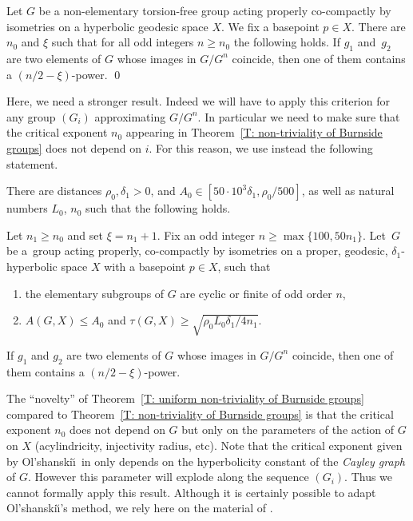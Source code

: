 \begin{thm}
\label{T: non-triviality of Burnside groups}
Let $G$ be a non-elementary torsion-free group acting properly co-compactly by isometries on a hyperbolic geodesic space $X$.
We fix a basepoint $p \in X$.
There are $n_0$ and $\xi$ such that for all odd integers $n\geqslant n_0$ the following holds.
If $g_1$ and~$g_2$ are two elements of $G$ whose images in $G/G^n$ coincide, then one of them contains a $(n/2-\xi)$-power. \qed
\end{thm}

Here, we need a stronger result.
Indeed we will have to apply this criterion for any group $(G_i)$ approximating $G/G^n$.
In particular we need to make sure that the critical exponent $n_0$ appearing in Theorem~\ref{T: non-triviality of Burnside groups} does not depend on $i$.
For this reason, we use instead the following statement.

\begin{thm}
\label{T: uniform non-triviality of Burnside groups}
There are distances $\rho_0,\delta_1> 0$, and $A_0 \in [50 \cdot 10^3\delta_1, \rho_0/500]$, as well as natural numbers $L_0$, $n_0$ such that the following holds.

Let $n_1 \geq n_0$ and set $\xi = n_1+ 1$.
Fix an odd integer $n \geq \max\{100, 50n_1\}$.
Let~$G$ be a~group acting properly, co-compactly by isometries on a proper, geodesic, $\delta_1$-hyperbolic space $X$ with a basepoint $p \in X$, such that
\begin{enumerate}
\item
the elementary subgroups of $G$ are cyclic or finite of odd order $n$,
\item
$A(G,X)\leqslant A_0$ and $\tau(G,X)\geqslant \sqrt{\rho_0 L_0 \delta_1/4n_1}$.
\end{enumerate}
If $g_1$ and $g_2$ are two elements of $G$ whose images in $G/G^n$ coincide, then one of them contains a $(n/2-\xi)$-power.
\end{thm}

\begin{rem}
The ``novelty'' of Theorem~\ref{T: uniform non-triviality of Burnside groups} compared to Theorem~\ref{T: non-triviality of Burnside groups} is that the critical exponent $n_0$ does not depend on $G$ but only on the parameters of the action of $G$ on $X$ (acylindricity, injectivity radius, etc).
Note that the critical exponent given by Ol'shanski\u\i\ in \cite{olshanskii_periodic_1991} only depends on the hyperbolicity constant of the \emph{Cayley graph} of $G$.
However this parameter will explode along the sequence $(G_i)$.
Thus we cannot formally apply this result.
Although it is certainly possible to adapt Ol'shanski\u\i's method, we rely here on the material of \cite{coulon_detecting_2018}.
\end{rem}

